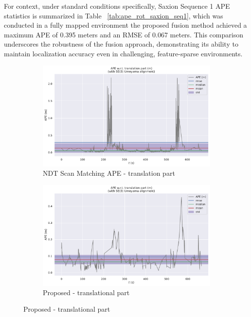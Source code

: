 For context, under standard conditions specifically, Saxion Sequence 1 APE statistics is summarized in Table ~\ref{tab:ape_rot_saxion_seq1}, which was conducted in a fully mapped environment the proposed fusion method achieved a maximum APE of 0.395 meters and an RMSE of 0.067 meters. This comparison underscores the robustness of the fusion approach, demonstrating its ability to maintain localization accuracy even in challenging, feature-sparse environments.

\begin{figure}[H]
	\centering
	\begin{subfigure}[t]{0.49\textwidth}
		\includegraphics[width=\linewidth]{images/unmappedzone_error_ndt2.pdf}
		\caption{ NDT Scan Matching  APE - translation part  }
		\label{fig:ape-error-unmapped-ndt}
	\end{subfigure}
	\hfill
	\begin{subfigure}[t]{0.49\textwidth}
		\includegraphics[width=\linewidth]{images/unmapped_zone_error_fused.pdf}
		\caption{ Proposed - translational part
}
\end{subfigure}
\end{figure}
